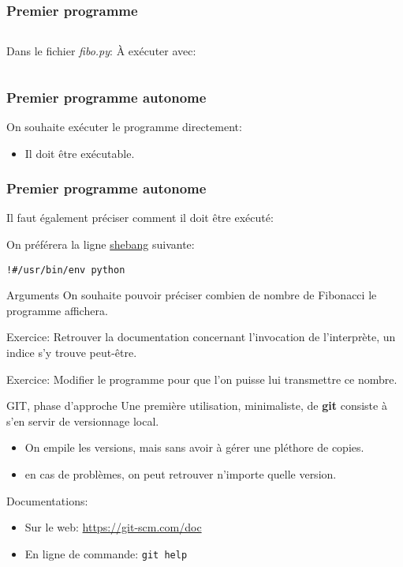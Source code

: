 \documentclass{beamer}
\begin{document}
\begin{frame}[fragile]\frametitle{Premier programme}
  \begin{columns}
    Dans le fichier {\it fibo.py}:\newline
    \fbox{}
    À exécuter avec:
    \fbox{}
  \end{columns}
\end{frame}

\begin{frame}[fragile]\frametitle{Premier programme autonome}
  On souhaite exécuter le programme directement:
  \begin{itemize}
  \item Il doit être exécutable.
  \end{itemize}
  \fbox{}
\end{frame}

\begin{frame}[fragile]\frametitle{Premier programme autonome}
  Il faut également préciser comment il doit être exécuté:
  \fbox{}

  On préférera la ligne \href{https://en.wikipedia.org/wiki/Shebang_(Unix)}{shebang} suivante:
\begin{verbatim}
!#/usr/bin/env python
\end{verbatim}
\end{frame}

\begin{frame}{Arguments}
  On souhaite pouvoir préciser combien de nombre de Fibonacci le programme affichera.

  Exercice: Retrouver la documentation concernant l'invocation de l'interprète, un indice s'y trouve peut-être.
  
  Exercice: Modifier le programme pour que l'on puisse lui transmettre ce nombre. 
\end{frame}

\begin{frame}{GIT, phase d'approche}
  Une première utilisation, minimaliste, de {\bf git} consiste à s'en servir de versionnage local.
  \begin{itemize}
  \item On empile les versions, mais sans avoir à gérer une pléthore de copies.
  \item en cas de problèmes, on peut retrouver n'importe quelle version.
  \end{itemize}
  Documentations:
  \begin{itemize}
  \item Sur le web: \url{https://git-scm.com/doc}
  \item En ligne de commande: {\tt git help}
  \end{itemize}
\end{frame}
\end{document}
